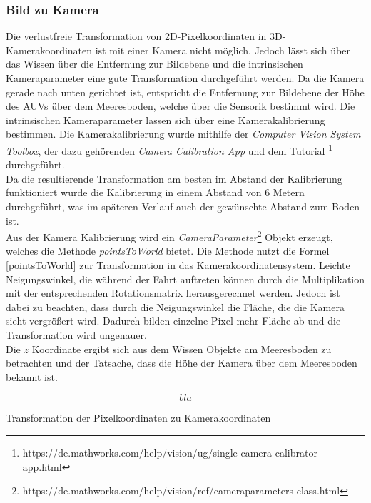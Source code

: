 \subsubsection{Bild zu Kamera}
\label{section_PicToCam}
Die verlustfreie Transformation von 2D-Pixelkoordinaten in 3D-Kamerakoordinaten ist mit einer Kamera nicht möglich. Jedoch lässt sich über das Wissen über die Entfernung zur Bildebene und die intrinsischen Kameraparameter eine gute Transformation durchgeführt werden. Da die Kamera gerade nach unten gerichtet ist, entspricht die Entfernung zur Bildebene der Höhe des AUVs über dem Meeresboden, welche über die Sensorik bestimmt wird. Die intrinsischen Kameraparameter lassen sich über eine Kamerakalibrierung bestimmen. Die Kamerakalibrierung wurde mithilfe der \matlab \textit{Computer Vision System Toolbox}, der dazu gehörenden \textit{Camera Calibration App} und dem Tutorial \footnote{https://de.mathworks.com/help/vision/ug/single-camera-calibrator-app.html} durchgeführt.\\
Da die resultierende Transformation am besten im Abstand der Kalibrierung funktioniert wurde die Kalibrierung in einem Abstand von 6 Metern durchgeführt, was im späteren Verlauf auch der gewünschte Abstand zum Boden ist.\\
Aus der Kamera Kalibrierung wird ein \textit{CameraParameter}\footnote{https://de.mathworks.com/help/vision/ref/cameraparameters-class.html} Objekt erzeugt, welches die Methode \textit{pointsToWorld} bietet. Die Methode nutzt die Formel \ref{pointsToWorld} zur Transformation in das Kamerakoordinatensystem. Leichte Neigungswinkel, die während der Fahrt auftreten können durch die Multiplikation mit der entsprechenden Rotationsmatrix herausgerechnet werden. Jedoch ist dabei zu beachten, dass durch die Neigungswinkel die Fläche, die die Kamera sieht vergrößert wird. Dadurch bilden einzelne Pixel mehr Fläche ab und die Transformation wird ungenauer.\\
Die $z$ Koordinate ergibt sich aus dem Wissen Objekte am Meeresboden zu betrachten und der Tatsache, dass die Höhe der Kamera über dem Meeresboden bekannt ist.

\begin{ownequation}[H]
\begin{equation}
bla
\end{equation}
\caption{Transformation der Pixelkoordinaten zu Kamerakoordinaten}
\label{pointsToWorld}
\end{ownequation}


